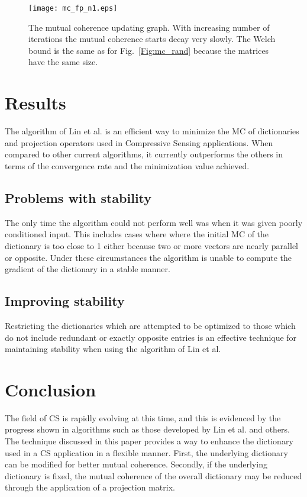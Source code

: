 \documentclass[journal]{IEEEtran}
\begin{document}
\begin{figure}[!h]
\centering
\texttt{[image: mc\_fp\_n1.eps]}
\caption{The mutual coherence updating graph. With increasing number of iterations the mutual coherence starts decay very slowly. The Welch bound is the same as for Fig.~\ref{Fig:mc_rand} because the matrices have the same size.}
\label{Fig:mc}
\end{figure}


\section{Results}
The algorithm of Lin et al. is an efficient way to minimize the MC of dictionaries and projection operators used
in Compressive Sensing applications. When compared to other current algorithms, it currently
outperforms the others in terms of the convergence rate and the minimization value achieved.
\subsection{Problems with stability}
The only time the algorithm could not perform well was
when it was given poorly conditioned input. This includes cases where where the initial MC of the
dictionary is too close to 1 either because two or more vectors are nearly parallel or opposite. Under these circumstances the algorithm is unable to compute the gradient of the dictionary in a stable manner.

\subsection{Improving stability}
Restricting the dictionaries which are attempted to be optimized to those which do not 
include redundant or exactly opposite entries is an effective technique for maintaining stability 
when using the algorithm of Lin et al.
\section{Conclusion}
The field of CS is rapidly evolving at this time, and this is evidenced by the progress shown
in algorithms such as those developed by Lin et al. and others. The technique discussed in this paper 
provides a way to enhance the dictionary used in a CS application in a flexible manner. First, the 
underlying dictionary can be modified for better mutual coherence. Secondly, if the underlying dictionary is fixed, the 
mutual coherence of the overall dictionary may be reduced through the application of a projection
matrix.
\end{document}
